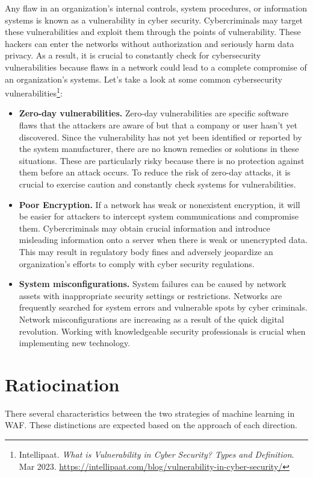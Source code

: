 Any flaw in an organization's internal controls, system procedures, or information systems is known as a vulnerability in cyber security. Cybercriminals may target these vulnerabilities and exploit them through the points of vulnerability.
These hackers can enter the networks without authorization and seriously harm data privacy. As a result, it is crucial to constantly check for cybersecurity vulnerabilities because flaws in a network could lead to a complete compromise of an organization's systems.
Let's take a look at some common cybersecurity vulnerabilities\footnote{
    Intellipaat. \textit{What is Vulnerability in Cyber Security? Types and Definition}.
    Mar 2023.
    \url{https://intellipaat.com/blog/vulnerability-in-cyber-security/}
}:
\begin{itemize}
    \item \textbf{Zero-day vulnerabilities.}
    Zero-day vulnerabilities are specific software flaws that the attackers are aware of but that a company or user hasn't yet discovered.
    Since the vulnerability has not yet been identified or reported by the system manufacturer, there are no known remedies or solutions in these situations. These are particularly risky because there is no protection against them before an attack occurs. To reduce the risk of zero-day attacks, it is crucial to exercise caution and constantly check systems for vulnerabilities.
    \item \textbf{Poor Encryption.}
    If a network has weak or nonexistent encryption, it will be easier for attackers to intercept system communications and compromise them. Cybercriminals may obtain crucial information and introduce misleading information onto a server when there is weak or unencrypted data. This may result in regulatory body fines and adversely jeopardize an organization's efforts to comply with cyber security regulations.
    \item \textbf{System misconfigurations.}
    System failures can be caused by network assets with inappropriate security settings or restrictions. Networks are frequently searched for system errors and vulnerable spots by cyber criminals. Network misconfigurations are increasing as a result of the quick digital revolution. Working with knowledgeable security professionals is crucial when implementing new technology.

\end{itemize}

\section{Ratiocination}
\label{ratio}
\hspace{0.5cm}There several characteristics between the two strategies of machine learning in WAF. These distinctions are expected based on the approach of each direction.

